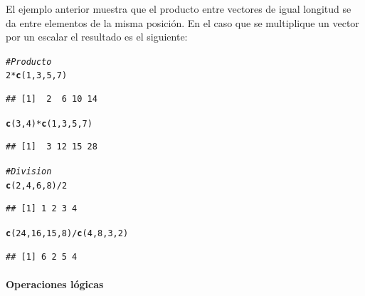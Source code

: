 \documentclass[11pt,a4paper,oneside]{book}\usepackage[]{graphicx}\usepackage[]{color}
\makeatletter
\newcommand{\hlnum}[1]{\textcolor[rgb]{0.686,0.059,0.569}{#1}}%
\newcommand{\hlcom}[1]{\textcolor[rgb]{0.678,0.584,0.686}{\textit{#1}}}%
\newcommand{\hlopt}[1]{\textcolor[rgb]{0,0,0}{#1}}%
\newcommand{\hlstd}[1]{\textcolor[rgb]{0.345,0.345,0.345}{#1}}%
\newcommand{\hlkwd}[1]{\textcolor[rgb]{0.737,0.353,0.396}{\textbf{#1}}}%
\newenvironment{kframe}{%
 \def\at@end@of@kframe{}%
 \ifinner\ifhmode%
  \def\at@end@of@kframe{\end{minipage}}%
  \begin{minipage}{\columnwidth}%
 \fi\fi%
 \def\FrameCommand##1{\hskip\@totalleftmargin \hskip-\fboxsep
 \colorbox{shadecolor}{##1}\hskip-\fboxsep
     \hskip-\linewidth \hskip-\@totalleftmargin \hskip\columnwidth}%
 \MakeFramed {\advance\hsize-\width
   \@totalleftmargin\z@ \linewidth\hsize
   \@setminipage}}%
 {\par\unskip\endMakeFramed%
 \at@end@of@kframe}
\newenvironment{knitrout}{}{} %
\makeatother
\begin{document}
\begin{itemize}
El ejemplo anterior muestra que el producto entre vectores de igual longitud se da entre elementos de la misma posición. En el caso que se multiplique un vector por un escalar el resultado es el siguiente:
\begin{knitrout}
\color{fgcolor}\begin{kframe}
\begin{alltt}
\hlcom{# Producto}
\hlnum{2} \hlopt{*} \hlkwd{c}\hlstd{(}\hlnum{1}\hlstd{,} \hlnum{3}\hlstd{,} \hlnum{5}\hlstd{,} \hlnum{7}\hlstd{)}
\end{alltt}
\begin{verbatim}
## [1]  2  6 10 14
\end{verbatim}
\begin{alltt}
\hlkwd{c}\hlstd{(}\hlnum{3}\hlstd{,} \hlnum{4}\hlstd{)} \hlopt{*} \hlkwd{c}\hlstd{(}\hlnum{1}\hlstd{,} \hlnum{3}\hlstd{,} \hlnum{5}\hlstd{,} \hlnum{7}\hlstd{)}
\end{alltt}
\begin{verbatim}
## [1]  3 12 15 28
\end{verbatim}
\begin{alltt}
\hlcom{# Division}
\hlkwd{c}\hlstd{(}\hlnum{2}\hlstd{,} \hlnum{4}\hlstd{,} \hlnum{6}\hlstd{,} \hlnum{8}\hlstd{)} \hlopt{/} \hlnum{2}
\end{alltt}
\begin{verbatim}
## [1] 1 2 3 4
\end{verbatim}
\begin{alltt}
\hlkwd{c}\hlstd{(}\hlnum{24}\hlstd{,} \hlnum{16}\hlstd{,} \hlnum{15}\hlstd{,} \hlnum{8}\hlstd{)} \hlopt{/} \hlkwd{c}\hlstd{(}\hlnum{4}\hlstd{,} \hlnum{8}\hlstd{,} \hlnum{3}\hlstd{,} \hlnum{2}\hlstd{)}
\end{alltt}
\begin{verbatim}
## [1] 6 2 5 4
\end{verbatim}
\end{kframe}
\end{knitrout}

\paragraph{Operaciones lógicas}
~\\


\end{itemize}
\end{document}
